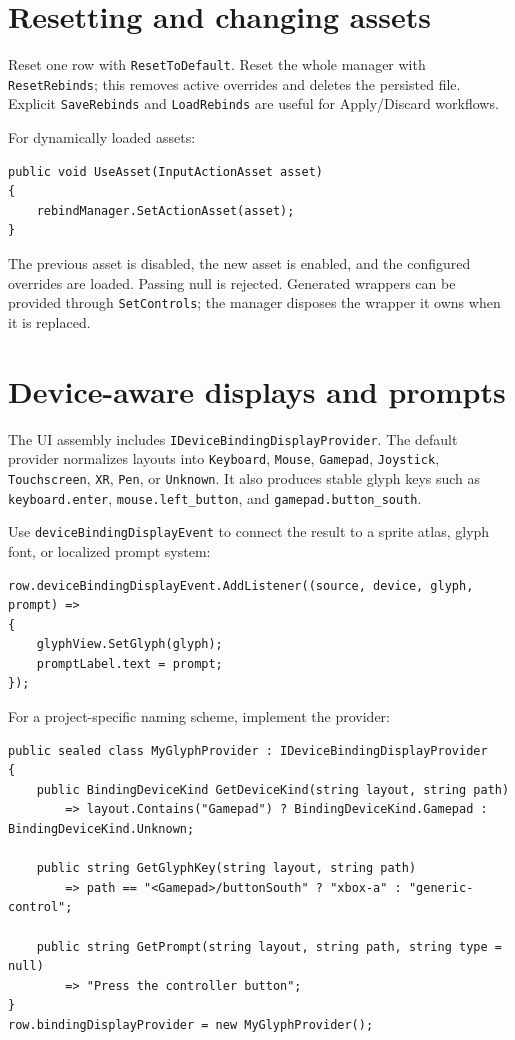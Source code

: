 \documentclass[11pt,a4paper]{article}
\newcommand{\class}[1]{\texttt{#1}}
\newcommand{\pathref}[1]{\texttt{#1}}
\begin{document}
\section{Resetting and changing assets}
Reset one row with \class{ResetToDefault}. Reset the whole manager with \class{ResetRebinds}; this removes active overrides and deletes the persisted file. Explicit \class{SaveRebinds} and \class{LoadRebinds} are useful for Apply/Discard workflows.

For dynamically loaded assets:
\begin{lstlisting}[style=csharp]
public void UseAsset(InputActionAsset asset)
{
    rebindManager.SetActionAsset(asset);
}
\end{lstlisting}
The previous asset is disabled, the new asset is enabled, and the configured overrides are loaded. Passing null is rejected. Generated wrappers can be provided through \class{SetControls}; the manager disposes the wrapper it owns when it is replaced.

\section{Device-aware displays and prompts}
The UI assembly includes \class{IDeviceBindingDisplayProvider}. The default provider normalizes layouts into \class{Keyboard}, \class{Mouse}, \class{Gamepad}, \class{Joystick}, \class{Touchscreen}, \class{XR}, \class{Pen}, or \class{Unknown}. It also produces stable glyph keys such as \pathref{keyboard.enter}, \pathref{mouse.left\_button}, and \pathref{gamepad.button\_south}.

Use \class{deviceBindingDisplayEvent} to connect the result to a sprite atlas, glyph font, or localized prompt system:
\begin{lstlisting}[style=csharp]
row.deviceBindingDisplayEvent.AddListener((source, device, glyph, prompt) =>
{
    glyphView.SetGlyph(glyph);
    promptLabel.text = prompt;
});
\end{lstlisting}
For a project-specific naming scheme, implement the provider:
\begin{lstlisting}[style=csharp]
public sealed class MyGlyphProvider : IDeviceBindingDisplayProvider
{
    public BindingDeviceKind GetDeviceKind(string layout, string path)
        => layout.Contains("Gamepad") ? BindingDeviceKind.Gamepad : BindingDeviceKind.Unknown;

    public string GetGlyphKey(string layout, string path)
        => path == "<Gamepad>/buttonSouth" ? "xbox-a" : "generic-control";

    public string GetPrompt(string layout, string path, string type = null)
        => "Press the controller button";
}
row.bindingDisplayProvider = new MyGlyphProvider();
\end{lstlisting}
\end{document}
